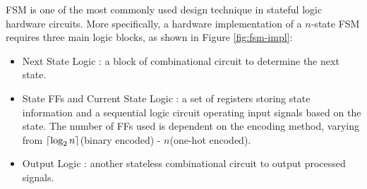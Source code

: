 \documentclass[a4paper]{report}
\DeclarePairedDelimiter\ceil{\lceil}{\rceil}
\begin{document}
FSM is one of the most commonly used design technique in stateful logic hardware circuits. More specifically, a hardware implementation of a $n$-state FSM requires three main logic blocks, as shown in Figure \ref{fig:fsm-impl}:
\begin{itemize}
    \item Next State Logic : a block of combinational circuit to determine the next state.
    \item State FFs and Current State Logic : a set of registers storing state information and a sequential logic circuit operating input signals based on the state. The number of FFs used is dependent on the encoding method, varying from $\ceil*{\log_2 n}$(binary encoded) - $n$(one-hot encoded).
    \item Output Logic : another stateless combinational circuit to output processed signals.
\end{itemize}
\end{document}
